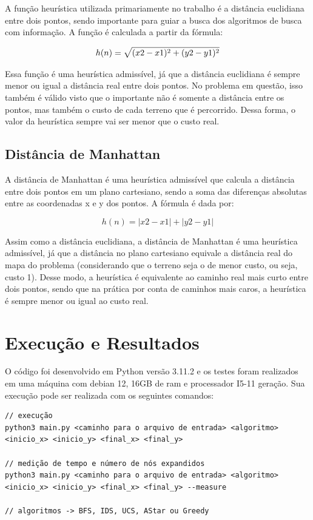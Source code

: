 \documentclass[10pt]{extarticle} %
\begin{document}
A função heurística utilizada primariamente no trabalho é a distância euclidiana entre dois pontos, sendo importante para guiar a busca dos algoritmos de busca com informação. A função é calculada a partir da fórmula: 

\begin{equation}
    h(n) = \sqrt{(x2 - x1)\textsuperscript{2} + (y2 - y1)\textsuperscript{2}}
\end{equation}

Essa função é uma heurística admissível, já que a distância euclidiana é sempre menor ou igual a distância real entre dois pontos. No problema em questão, isso também é válido visto que o importante não é somente a distância entre os pontos, mas também o custo de cada terreno que é percorrido. Dessa forma, o valor da heurística sempre vai ser menor que o custo real.

\subsection{Distância de Manhattan}

A distância de Manhattan é uma heurística admissível que calcula a distância entre dois pontos em um plano cartesiano, sendo a soma das diferenças absolutas entre as coordenadas x e y dos pontos. A fórmula é dada por:

\begin{equation}
    h(n) = |x2 - x1| + |y2 - y1|
\end{equation}

Assim como a distância euclidiana, a distância de Manhattan é uma heurística admissível, já que a distância no plano cartesiano equivale a distância real do mapa do problema (considerando que o terreno seja o de menor custo, ou seja, custo 1). Desse modo, a heurística é equivalente ao caminho real mais curto entre dois pontos, sendo que na prática por conta de caminhos mais caros, a heurística é sempre menor ou igual ao custo real.

\section{Execução e Resultados}

O código foi desenvolvido em Python versão 3.11.2 e os testes foram realizados em uma máquina com debian 12, 16GB de ram e processador I5-11 geração. Sua execução pode ser realizada com os seguintes comandos:

\begin{verbatim}
// execução
python3 main.py <caminho para o arquivo de entrada> <algoritmo> <inicio_x> <inicio_y> <final_x> <final_y>

// medição de tempo e número de nós expandidos
python3 main.py <caminho para o arquivo de entrada> <algoritmo> <inicio_x> <inicio_y> <final_x> <final_y> --measure

// algoritmos -> BFS, IDS, UCS, AStar ou Greedy
\end{verbatim}
\end{document}
